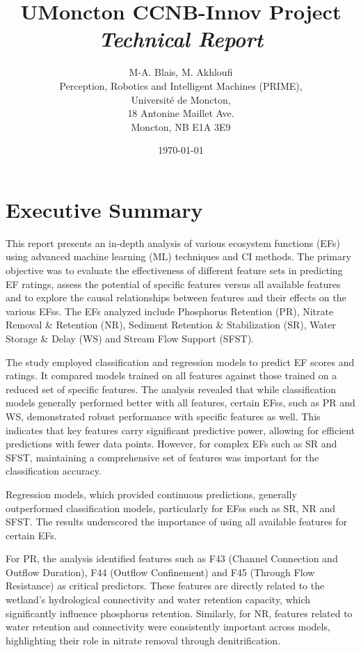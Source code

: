 \documentclass[12pt,letterpaper]{article}
\title{\textbf{UMoncton CCNB-Innov Project} 
\textit{Technical Report}}
\author{M-A. Blais, M. Akhloufi \\
Perception, Robotics and Intelligent Machines (PRIME), \\
Université de Moncton, \\
18 Antonine Maillet Ave. \\
Moncton, NB E1A 3E9}
\date{\today}
\begin{document}
\maketitle
\thispagestyle{empty}



\clearpage 
\thispagestyle{plain}
\tableofcontents %

\section*{Executive Summary}

This report presents an in-depth analysis of various ecosystem functions (\acp{EF}) using advanced machine learning (\ac{ML}) techniques and \ac{CI} methods.
The primary objective was to evaluate the effectiveness of different feature sets in predicting \ac{EF} ratings, assess the potential of specific features versus all available features and to explore the causal relationships between features and their effects on the various \acp{EF}s.
The \acp{EF} analyzed include Phosphorus Retention (\ac{PR}), Nitrate Removal \& Retention (\ac{NR}), Sediment Retention \& Stabilization (\ac{SR}), Water Storage \& Delay (\ac{WS}) and Stream Flow Support (\ac{SFST}).

The study employed classification and regression models to predict \ac{EF} scores and ratings.
It compared models trained on all features against those trained on a reduced set of specific features.
The analysis revealed that while classification models generally performed better with all features, certain \acp{EF}s, such as \ac{PR} and \ac{WS}, demonstrated robust performance with specific features as well.
This indicates that key features carry significant predictive power, allowing for efficient predictions with fewer data points.
However, for complex \ac{EF}s such as \ac{SR} and \ac{SFST}, maintaining a comprehensive set of features was important for the classification accuracy.

Regression models, which provided continuous predictions, generally outperformed classification models, particularly for \acp{EF}s such as \ac{SR}, \ac{NR} and \ac{SFST}.
The results underscored the importance of using all available features for certain \ac{EF}s.

For \ac{PR}, the analysis identified features such as F43 (Channel Connection and Outflow Duration), F44 (Outflow Confinement) and F45 (Through Flow Resistance) as critical predictors.
These features are directly related to the wetland's hydrological connectivity and water retention capacity, which significantly influence phosphorus retention.
Similarly, for \ac{NR}, features related to water retention and connectivity were consistently important across models, highlighting their role in nitrate removal through denitrification.
\end{document}
